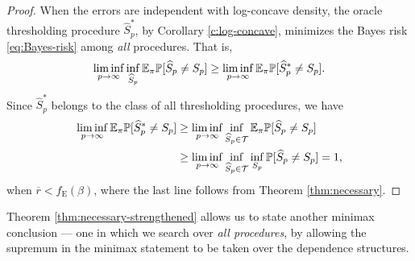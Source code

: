 \begin{proof}%
When the errors are independent with log-concave density, the oracle thresholding procedure $\widehat{S}^*_p$, by Corollary \ref{c:log-concave}, minimizes the Bayes risk \eqref{eq:Bayes-risk} among \emph{all} procedures. That is,
$$
\liminf_{p\to\infty} \inf_{\widehat{S}_p} {\mathbb E}_\pi{\mathbb P}[\widehat{S}_p\neq S_p]
\ge \liminf_{p\to\infty} {\mathbb E}_\pi{\mathbb P}[\widehat{S}^*_p\neq S_p].
$$
Since $\widehat{S}^*_p$ belongs to the class of all thresholding procedures, we have
\begin{align*}
    \liminf_{p\to\infty} {\mathbb E}_\pi{\mathbb P}[\widehat{S}^*_p\neq S_p] 
    &\ge \liminf_{p\to\infty} \inf_{\widehat{S}_p\in{\cal T}} {\mathbb E}_\pi{\mathbb P}[\widehat{S}_p\neq S_p] \\
    &\ge \liminf_{p\to\infty} \inf_{\widehat{S}_p\in{\cal T}} \inf_{S_p} {\mathbb P}[\widehat{S}_p\neq S_p] = 1,
\end{align*}
when $\overline{r}<f_{\mathrm{E}}(\beta)$, where the last line follows from Theorem \ref{thm:necessary}.
\end{proof}


Theorem \ref{thm:necessary-strengthened} allows us to state another minimax conclusion --- one in which we search over \emph{all procedures}, by allowing the supremum in the minimax statement to be taken over the dependence structures. 

